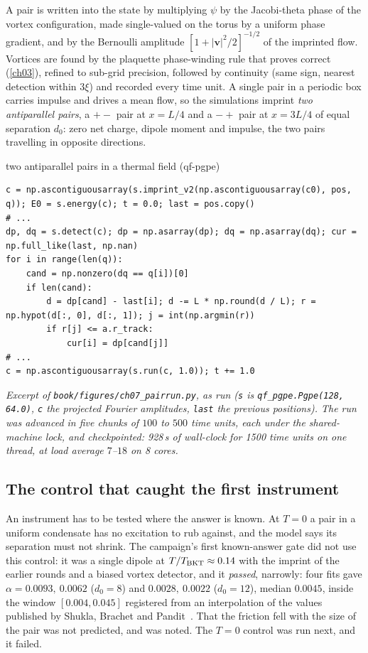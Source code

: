 A pair is written into the state by multiplying $\psi$ by the Jacobi-theta phase of the vortex configuration, made single-valued on the torus by a uniform phase gradient, and by the Bernoulli amplitude $[1+|\mathbf v|^2/2]^{-1/2}$ of the imprinted flow. Vortices are found by the
plaquette phase-winding rule that  proves correct (\cref{ch03}), refined to sub-grid precision, followed by continuity (same sign, nearest detection within $3\xi$) and recorded every time unit. A single pair in a periodic box carries impulse and drives a mean flow, so the
simulations imprint \emph{two antiparallel pairs}, a $+-$ pair at $x=L/4$ and a $-+$ pair at $x=3L/4$ of equal separation $d_0$: zero net charge, dipole moment and impulse, the two pairs travelling in opposite directions.

\begin{rustbox}{two antiparallel pairs in a thermal field (qf-pgpe)}
\begin{lstlisting}[style=py,basicstyle=\ttfamily\footnotesize]
c = np.ascontiguousarray(s.imprint_v2(np.ascontiguousarray(c0), pos, q)); E0 = s.energy(c); t = 0.0; last = pos.copy()
# ...
dp, dq = s.detect(c); dp = np.asarray(dp); dq = np.asarray(dq); cur = np.full_like(last, np.nan)
for i in range(len(q)):
    cand = np.nonzero(dq == q[i])[0]
    if len(cand):
        d = dp[cand] - last[i]; d -= L * np.round(d / L); r = np.hypot(d[:, 0], d[:, 1]); j = int(np.argmin(r))
        if r[j] <= a.r_track:
            cur[i] = dp[cand[j]]
# ...
c = np.ascontiguousarray(s.run(c, 1.0)); t += 1.0
\end{lstlisting}
\nopagebreak[4]\smallskip\noindent\textit{Excerpt of \texttt{book/figures/ch07\_pairrun.py}, as run (\texttt{s} is \texttt{qf\_pgpe.Pgpe(128, 64.0)}, \texttt{c} the projected Fourier amplitudes, \texttt{last} the previous positions). The run was advanced in five chunks of $100$ to $500$ time units, each under the
shared-machine lock, and checkpointed: 928\,s of wall-clock for 1500 time units on one thread, at load average $7$--$18$ on 8 cores.}
\end{rustbox}

\subsection*{The control that caught the first instrument}

An instrument has to be tested where the answer is known. At $T=0$ a pair in a uniform condensate has no excitation to rub against, and the model says its separation must not shrink. The campaign's first known-answer gate did not use this control: it was a single dipole at $T/T_{\rm BKT}\approx0.14$ with the
imprint of the earlier rounds and a biased vortex detector, and it \emph{passed}, narrowly: four fits gave $\alpha=0.0093,\ 0.0062$ ($d_0=8$) and $0.0028,\ 0.0022$ ($d_0=12$), median $0.0045$, inside the window $[0.004,0.045]$ registered from an interpolation of the values published by Shukla, Brachet and Pandit~\cite{Shukla2014}.
That the friction fell with the size of the pair was not predicted, and was noted. The $T=0$ control was run next, and it failed.

